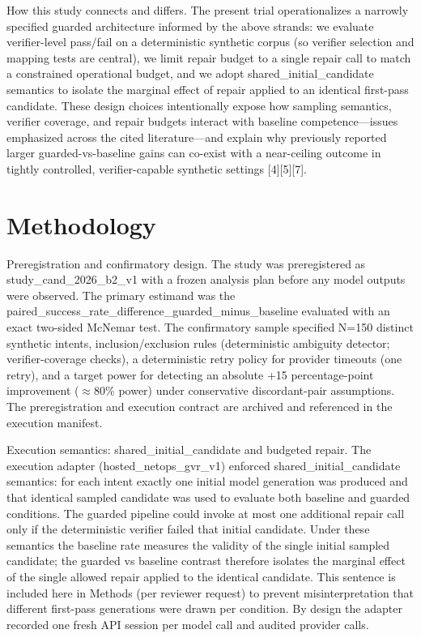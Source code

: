 \documentclass[conference]{IEEEtran}
\begin{document}
How this study connects and differs. The present trial operationalizes a narrowly specified guarded architecture informed by the above strands: we evaluate verifier-level pass/fail on a deterministic synthetic corpus (so verifier selection and mapping tests are central), we limit repair budget to a single repair call to match a constrained operational budget, and we adopt shared\_initial\_candidate semantics to isolate the marginal effect of repair applied to an identical first-pass candidate. These design choices intentionally expose how sampling semantics, verifier coverage, and repair budgets interact with baseline competence---issues emphasized across the cited literature---and explain why previously reported larger guarded-vs-baseline gains can co-exist with a near-ceiling outcome in tightly controlled, verifier-capable synthetic settings [4][5][7].

\section{Methodology}
Preregistration and confirmatory design. The study was preregistered as study\_cand\_2026\_b2\_v1 with a frozen analysis plan before any model outputs were observed. The primary estimand was the paired\_success\_rate\_difference\_guarded\_minus\_baseline evaluated with an exact two-sided McNemar test. The confirmatory sample specified N=150 distinct synthetic intents, inclusion/exclusion rules (deterministic ambiguity detector; verifier-coverage checks), a deterministic retry policy for provider timeouts (one retry), and a target power for detecting an absolute +15 percentage-point improvement (\ensuremath{\approx}80\% power) under conservative discordant-pair assumptions. The preregistration and execution contract are archived and referenced in the execution manifest.

Execution semantics: shared\_initial\_candidate and budgeted repair. The execution adapter (hosted\_netops\_gvr\_v1) enforced shared\_initial\_candidate semantics: for each intent exactly one initial model generation was produced and that identical sampled candidate was used to evaluate both baseline and guarded conditions. The guarded pipeline could invoke at most one additional repair call only if the deterministic verifier failed that initial candidate. Under these semantics the baseline rate measures the validity of the single initial sampled candidate; the guarded vs baseline contrast therefore isolates the marginal effect of the single allowed repair applied to the identical candidate. This sentence is included here in Methods (per reviewer request) to prevent misinterpretation that different first-pass generations were drawn per condition. By design the adapter recorded one fresh API session per model call and audited provider calls.
\end{document}
